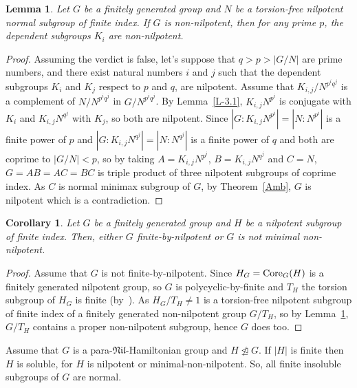 \documentclass[11pt]{amsart}
\newtheorem{lemma}[theorem]{Lemma}
\newtheorem{corollary}[theorem]{Corollary}
\newcommand{\Core}{{\rm Core}}
\newcommand{\nno}{\ntrianglelefteq}
\begin{document}
\begin{lemma}\label{L-3.2}
Let $G$ be a finitely generated group and $N$ be a torsion-free nilpotent normal subgroup of finite index. If $G$ is non-nilpotent, then for any prime $p$, the dependent subgroups $K_i$ are non-nilpotent.
\end{lemma}
\begin{proof}
Assuming the verdict is false, let's suppose that $q>p>|G/N|$ are prime numbers, and there exist natural numbers $i$ and $j$ such that the dependent subgroups $K_i$ and $K_j$ respect to $p$ and $q$,  are nilpotent. Assume that $K_{i,j}/N^{p^iq^j}$ is a complement of $N/N^{p^iq^j}$ in $G/N^{p^iq^j}$. By Lemma~\ref{L-3.1}, $K_{i,j}N^{p^i}$ is conjugate with $K_i$ and $K_{i,j}N^{q^j}$ with $K_j$, so both are nilpotent. Since $|G:K_{i,j}N^{p^i}|=|N: N^{p^i}|$ is a finite power of $p$ and $|G:K_{i,j}N^{q^j}|=|N: N^{q^j}|$ is a finite power of $q$ and both are coprime to $|G/N|<p$, so by taking $A=K_{i,j}N^{p^i}$,  $B=K_{i,j}N^{q^j}$ and $C=N$, $G=AB=AC=BC$ is triple product of three nilpotent subgroups of coprime index. As $C$ is normal minimax subgroup of $G$, by Theorem~\ref{Amb}, $G$ is nilpotent which is a contradiction.
\end{proof}

\begin{corollary}\label{C-3.3}
Let $G$ be a finitely generated group and $H$ be a nilpotent subgroup of finite index. Then, either $G$ finite-by-nilpotent or $G$ is not minimal non-nilpotent.
\end{corollary}
\begin{proof}
Assume that $G$ is not finite-by-nilpotent. Since $H_G=\Core_G(H)$ is a finitely generated nilpotent group, so $G$ is polycyclic-by-finite and $T_H$ the torsion subgroup of $H_G$ is finite (by~\cite[2.49(ii)]{DKS}). As $H_G/T_H\neq 1$ is a torsion-free nilpotent subgroup of finite index of a finitely generated non-nilpotent group $G/T_H$, so by Lemma~\ref{L-3.2}, $G/T_H$ contains a proper non-nilpotent subgroup, hence $G$ does too.
\end{proof}

Assume that $G$ is a para-$\mathfrak{Nil}$-Hamiltonian group and $H\nno G$. If $|H|$ is finite then $H$ is soluble, for $H$ is nilpotent or minimal-non-nilpotent. So, all finite insoluble subgroups of $G$ are normal.
\end{document}
